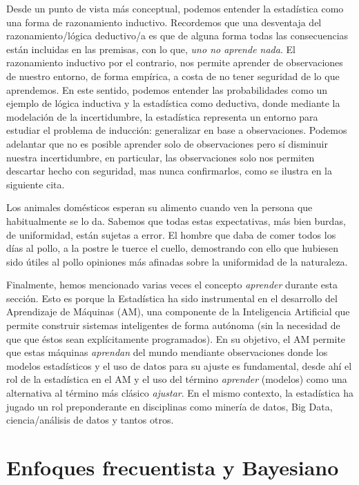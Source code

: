 Desde un punto de vista más conceptual, podemos entender la estadística como una forma de razonamiento inductivo. Recordemos que una desventaja del razonamiento/lógica deductivo/a es que de alguna forma todas las consecuencias están incluidas en las premisas, con lo que, \emph{uno no aprende nada}. El razonamiento inductivo por el contrario, nos permite aprender de observaciones de nuestro entorno, de forma empírica, a costa de no tener seguridad de lo que aprendemos. En este sentido, podemos entender las probabilidades como un ejemplo de lógica inductiva y la estadística como deductiva, donde mediante la modelación de la incertidumbre, la estadística representa un entorno para estudiar el problema de inducción: generalizar en base a observaciones. Podemos adelantar que no es posible aprender solo de observaciones pero sí disminuir nuestra incertidumbre, en particular, las observaciones solo nos permiten descartar hecho con seguridad, mas nunca confirmarlos, como se ilustra en la siguiente cita. 

\begin{displayquote}   
Los animales domésticos esperan su alimento
cuando ven la persona que habitualmente se lo da. Sabemos que todas estas
expectativas, más bien burdas, de uniformidad, están sujetas a error. El hombre que
daba de comer todos los días al pollo, a la postre le tuerce el cuello, demostrando con
ello que hubiesen sido útiles al pollo opiniones más afinadas sobre la uniformidad de la naturaleza.
\end{displayquote}

Finalmente, hemos mencionado varias veces el concepto \emph{aprender} durante esta sección. Esto es porque la Estadística ha sido instrumental en el desarrollo del Aprendizaje de Máquinas (AM),  una componente de la Inteligencia Artificial que permite construir sistemas inteligentes de forma autónoma (sin la necesidad de que que éstos sean explícitamente programados). En su objetivo, el AM permite que estas máquinas \emph{aprendan} del mundo mendiante observaciones donde los modelos estadísticos y el uso de datos para su ajuste es fundamental, desde ahí el rol de la estadística en el AM y el uso del término \emph{aprender} (modelos) como una alternativa al término más clásico \emph{ajustar}. En el mismo contexto, la estadística ha jugado un rol preponderante en disciplinas como minería de datos, Big Data, ciencia/análisis de datos y tantos otros. 

\section{Enfoques frecuentista y Bayesiano}

